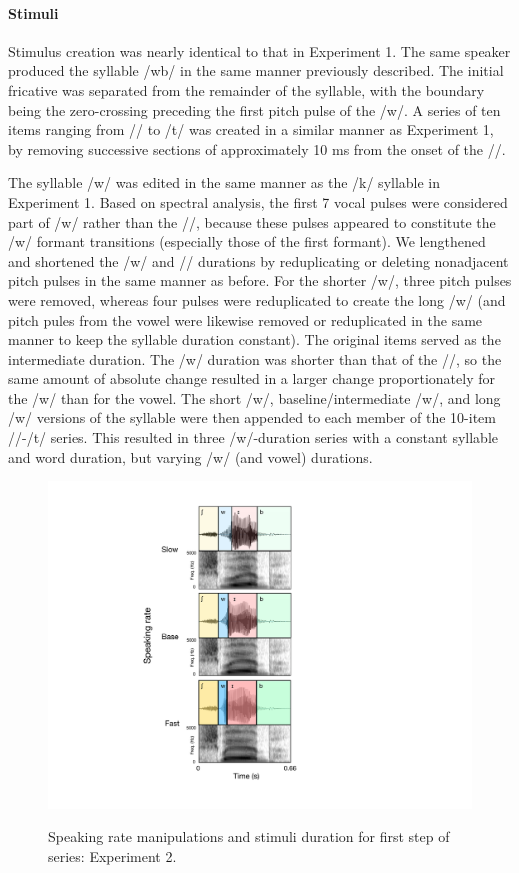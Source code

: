 \paragraph{Stimuli}

Stimulus creation was nearly identical to that in Experiment 1. The same speaker produced the syllable /\textesh w\textsci b/ in the same manner previously described. The initial fricative was separated from the remainder of the syllable, with the boundary being the zero-crossing preceding the first pitch pulse of the /w/. A series of ten items ranging from /\textesh/ to /t\textesh/ was created in a similar manner as Experiment 1, by removing successive sections of approximately 10 ms from the onset of the /\textesh/. 

The syllable /w\textsci/ was edited in the same manner as the /k\textscripta/ syllable in Experiment 1. Based on spectral analysis, the first 7 vocal pulses were considered part of /w/ rather than the /\textsci/, because these pulses appeared to constitute the /w/ formant transitions (especially those of the first formant). We lengthened and shortened the /w/ and /\textsci/ durations by reduplicating or deleting nonadjacent pitch pulses in the same manner as before. For the shorter /w/, three pitch pulses were removed, whereas four pulses were reduplicated to create the long /w/ (and pitch pules from the vowel were likewise removed or reduplicated in the same manner to keep the syllable duration constant). The original items served as the intermediate duration. The /w/ duration was shorter than that of the /\textsci/, so the same amount of absolute change resulted in a larger change proportionately for the /w/ than for the vowel. The short /w/, baseline/intermediate /w/, and long /w/ versions of the syllable were then appended to each member of the 10-item /\textesh/-/t\textesh/ series. This resulted in three /w/-duration series with a constant syllable and word duration, but varying /w/ (and vowel) durations.

\begin{figure}
\centering
\includegraphics[scale=.75]{figures/stimuli_schema_exp2.pdf}
\caption{\label{fig:schema}} Speaking rate manipulations and stimuli duration for first step of series: Experiment 2. 
\end{figure}

